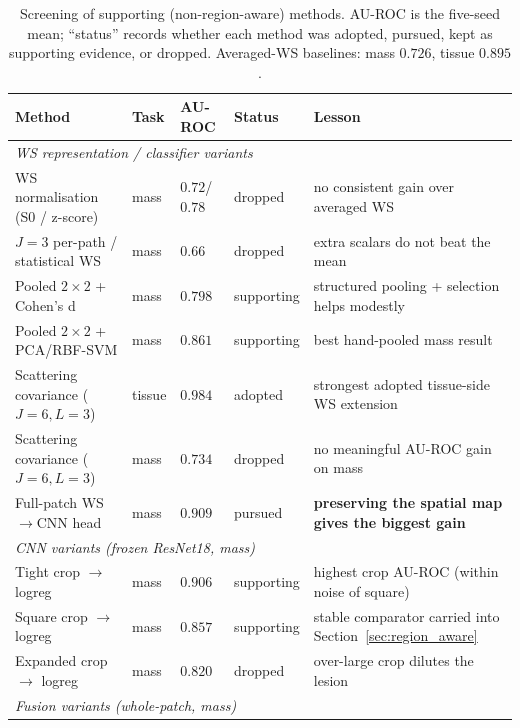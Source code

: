 \begin{table}[H]
\centering
\caption[Screening of supporting (non-region-aware) extension methods]{Screening of supporting (non-region-aware) methods. AU-ROC is the five-seed mean; ``status'' records whether each method was adopted, pursued, kept as supporting evidence, or dropped. Averaged-WS baselines: mass $0.726$, tissue $0.895$.}
\label{tab:screening_overview}
\small
\begin{tabular}{p{4.2cm}p{0.9cm}p{1.5cm}p{1.7cm}p{4.1cm}}
\toprule
\textbf{Method} & \textbf{Task} & \textbf{AU-ROC} & \textbf{Status} & \textbf{Lesson} \\
\midrule
\multicolumn{5}{l}{\textit{WS representation / classifier variants}} \\
WS normalisation (S0 / z-score)        & mass   & $0.72$/$0.78$ & dropped     & no consistent gain over averaged WS \\
$J{=}3$ per-path / statistical WS      & mass   & $0.66$        & dropped     & extra scalars do not beat the mean \\
Pooled $2{\times}2$ + Cohen's d        & mass   & $0.798$       & supporting  & structured pooling + selection helps modestly \\
Pooled $2{\times}2$ + PCA/RBF-SVM      & mass   & $0.861$       & supporting  & best hand-pooled mass result \\
Scattering covariance ($J{=}6,L{=}3$)  & tissue & $0.984$       & adopted     & strongest adopted tissue-side WS extension \\
Scattering covariance ($J{=}6,L{=}3$)  & mass   & $0.734$       & dropped     & no meaningful AU-ROC gain on mass \\
Full-patch WS$\rightarrow$CNN head     & mass   & $0.909$       & pursued     & \textbf{preserving the spatial map gives the biggest gain} \\
\midrule
\multicolumn{5}{l}{\textit{CNN variants (frozen ResNet18, mass)}} \\
Tight crop $\rightarrow$ logreg        & mass   & $0.906$       & supporting  & highest crop AU-ROC (within noise of square) \\
Square crop $\rightarrow$ logreg       & mass   & $0.857$       & supporting  & stable comparator carried into Section~\ref{sec:region_aware} \\
Expanded crop $\rightarrow$ logreg     & mass   & $0.820$       & dropped     & over-large crop dilutes the lesion \\
\midrule
\multicolumn{5}{l}{\textit{Fusion variants (whole-patch, mass)}} \\

\end{tabular}
\end{table}
